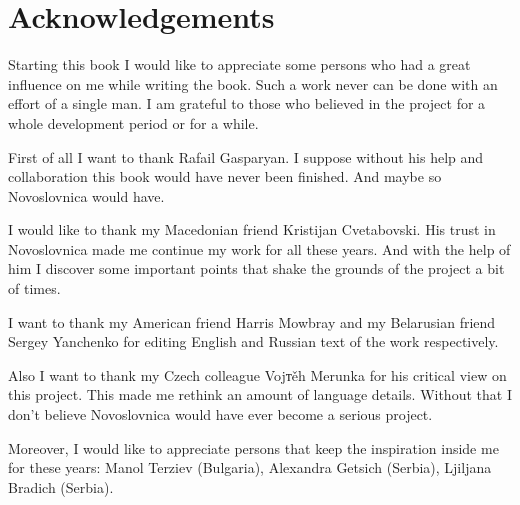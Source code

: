 \chapter{Acknowledgements}

Starting this book I would like to appreciate some persons who had a great influence on me while writing the book. Such a work never can be done with an effort of a single man. I am grateful to those who believed in the project for a whole development period or for a while.

First of all I want to thank Rafail Gasparyan. I suppose without his help and collaboration this book would have never been finished. And maybe so Novoslovnica would have.

I would like to thank my Macedonian friend Kristijan Cvetabovski. His trust in Novoslovnica made me continue my work for all these years. And with the help of him I discover some important points that shake the grounds of the project a bit of times.

I want to thank my American friend Harris Mowbray and my Belarusian friend Sergey Yanchenko for editing English and Russian text of the work respectively.

Also I want to thank my Czech colleague Vojтěh Merunka for his critical view on this project. This made me rethink an amount of language details. Without that I don't believe Novoslovnica would have ever become a serious project. 

Moreover, I would like to appreciate persons that keep the inspiration inside me for these years: Manol Terziev (Bulgaria), Alexandra Getsich (Serbia), Ljiljana Bradich (Serbia).
